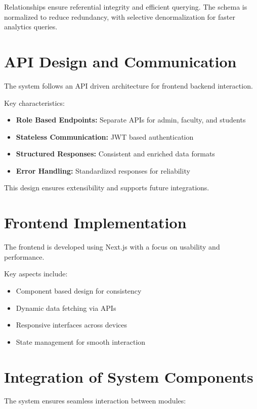 Relationships ensure referential integrity and efficient querying. The schema is normalized to
reduce redundancy, with selective denormalization for faster analytics queries.

\section{API Design and Communication}

The system follows an API driven architecture for frontend backend interaction.

Key characteristics:

\begin{itemize}
    \item \textbf{Role Based Endpoints:} Separate APIs for admin, faculty, and students
    \item \textbf{Stateless Communication:} JWT based authentication
    \item \textbf{Structured Responses:} Consistent and enriched data formats
    \item \textbf{Error Handling:} Standardized responses for reliability
\end{itemize}

This design ensures extensibility and supports future integrations.

\section{Frontend Implementation}

The frontend is developed using Next.js with a focus on usability and performance.

Key aspects include:

\begin{itemize}
    \item Component based design for consistency
    \item Dynamic data fetching via APIs
    \item Responsive interfaces across devices
    \item State management for smooth interaction
\end{itemize}

\section{Integration of System Components}

The system ensures seamless interaction between modules:

